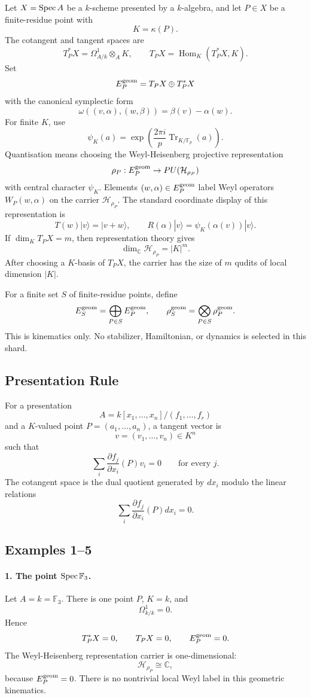 Let \(X=\operatorname{Spec} A\) be a \(k\)-scheme presented by a \(k\)-algebra, and let
\(P\in X\) be a finite-residue point with
\[
  K=\kappa(P).
\]
The cotangent and tangent spaces are
\[
  T_P^*X=\Omega^1_{A/k}\otimes_AK,\qquad
  T_PX=\operatorname{Hom}_K(T_P^*X,K).
\]
Set
\[
  E_P^{\rm geom}=T_PX\oplus T_P^*X
\]
with the canonical symplectic form
\[
  \omega((v,\alpha),(w,\beta))=\beta(v)-\alpha(w).
\]
For finite \(K\), use
\[
  \psi_K(a)=\exp\!\left(\frac{2\pi i}{p}
    \operatorname{Tr}_{K/\mathbb F_p}(a)\right).
\]
Quantisation means choosing the Weyl-Heisenberg projective representation
\[
  \rho_P:E_P^{\rm geom}\to PU(\mathcal H_{\rho_P})
\]
with central character \(\psi_K\).  Elements \((w,\alpha)\in E_P^{\rm geom}\)
label Weyl operators \(W_P(w,\alpha)\) on the carrier \(\mathcal H_{\rho_P}\).
The standard coordinate display of this representation is
\[
  T(w)|v\rangle=|v+w\rangle,\qquad
  R(\alpha)|v\rangle=\psi_K(\alpha(v))|v\rangle .
\]
If \(\dim_KT_PX=m\), then representation theory gives
\[
  \dim_{\mathbb C}\mathcal H_{\rho_P}=|K|^m.
\]
After choosing a \(K\)-basis of \(T_PX\), the carrier has the size of \(m\)
qudits of local dimension \(|K|\).

For a finite set \(S\) of finite-residue points, define
\[
  E_S^{\rm geom}=\bigoplus_{P\in S}E_P^{\rm geom},\qquad
  \rho_S^{\rm geom}=\bigotimes_{P\in S}\rho_P^{\rm geom}.
\]
This is kinematics only.  No stabilizer, Hamiltonian, or dynamics is selected
in this shard.

\subsection{Presentation Rule}

For a presentation
\[
  A=k[x_1,\ldots,x_n]/(f_1,\ldots,f_r)
\]
and a \(K\)-valued point \(P=(a_1,\ldots,a_n)\), a tangent vector is
\[
  v=(v_1,\ldots,v_n)\in K^n
\]
such that
\[
  \sum_i \frac{\partial f_j}{\partial x_i}(P)v_i=0
  \qquad\text{for every }j.
\]
The cotangent space is the dual quotient generated by \(dx_i\) modulo the
linear relations
\[
  \sum_i \frac{\partial f_j}{\partial x_i}(P)dx_i=0.
\]

\subsection{Examples 1--5}

\paragraph{1. The point \(\operatorname{Spec}\mathbb F_3\).}
Let \(A=k=\mathbb F_3\).  There is one point \(P\), \(K=k\), and
\[
  \Omega^1_{k/k}=0.
\]
Hence
\[
  T_P^*X=0,\qquad T_PX=0,\qquad E_P^{\rm geom}=0.
\]
The Weyl-Heisenberg representation carrier is one-dimensional:
\[
  \mathcal H_{\rho_P}\cong\mathbb C,
\]
because \(E_P^{\rm geom}=0\).  There is no nontrivial local Weyl label in this
geometric kinematics.

